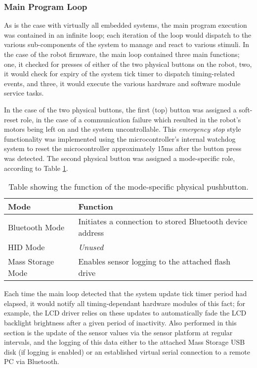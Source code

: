 \FloatBarrier
\subsubsection{Main Program Loop}

As is the case with virtually all embedded systems, the main program execution was contained in an infinite loop; each iteration of the loop would dispatch to the various sub-components of the system to manage and react to various stimuli. In the case of the robot firmware, the main loop contained three main functions; one, it checked for presses of either of the two physical buttons on the robot, two, it would check for expiry of the system tick timer to dispatch timing-related events, and three, it would execute the various hardware and software module service tasks.

In the case of the two physical buttons, the first (top) button was assigned a soft-reset role, in the case of a communication failure which resulted in the robot's motors being left on and the system uncontrollable. This \textit{emergency stop} style functionality was implemented using the microcontroller's internal watchdog system to reset the microcontroller approximately 15ms after the button press was detected. The second physical button was assigned a mode-specific role, according to Table \ref{tab:buttonroles}.

\begin{table}[tbph]
	\vspace{1em}
	\begin{center}
		\begin{tabular}{ | l | l | }
			\hline
			\textbf{Mode} & \textbf{Function} \\ \hline

			Bluetooth Mode & Initiates a connection to stored Bluetooth device address \\ \hline
			HID Mode & \textit{Unused} \\ \hline
			Mass Storage Mode & Enables sensor logging to the attached flash drive \\ \hline
		\end{tabular}
		\caption[Mode Specific Button Roles]{Table showing the function of the mode-specific physical pushbutton.}
		\label{tab:buttonroles}
	\end{center}
\end{table}

Each time the main loop detected that the system update tick timer period had elapsed, it would notify all timing-dependant hardware modules of this fact; for example, the LCD driver relies on these updates to automatically fade the LCD backlight brightness after a given period of inactivity. Also performed in this section is the update of the sensor values via the sensor platform at regular intervals, and the logging of this data either to the attached Mass Storage USB disk (if logging is enabled) or an established virtual serial connection to a remote PC via Bluetooth.

